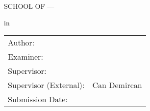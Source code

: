 \begin{titlepage}
  \centering


  \vspace{5mm}
  {\huge\MakeUppercase{School of \getSchool{} --- \getFaculty{}} \par}

  \vspace{5mm}
  {\large\MakeUppercase{\getUniversity{}} \par}

  \vspace{20mm}
  {\Large \getDoctype{} in \getDegree{} \par}

  \vspace{15mm}
  {\huge\bfseries \getTitle{} \par}

  \vspace{10mm}
  {\huge\bfseries \foreignlanguage{ngerman}{\getTitleGer{}} \par}

  \vspace{15mm}
  \begin{tabular}{l l}
    Author:          & \getAuthor{}         \\
    Examiner:      & \getSupervisor{}     \\
    Supervisor:         & \getAdvisor{}        \\
    Supervisor (External):         & Can Demircan \\
    Submission Date: & \getSubmissionDate{} \\
  \end{tabular}

\end{titlepage}
